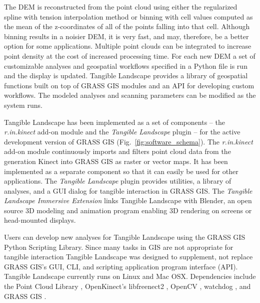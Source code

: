 \documentclass[prodmode,acmtochi]{acmsmall} %
\begin{document}
The DEM is reconstructed from the point cloud
using either the regularized spline with tension 
interpolation method \cite{Mitasova2005}
or binning with cell values computed 
as the mean of the z-coordinates of all of the points 
falling into that cell.
Although binning results in a noisier DEM, it is very fast,
and may, therefore, be a better option for some applications. 
Multiple point clouds can be integrated 
to increase point density at the cost of increased
processing time.
%
For each new DEM 
a set of customizable analyses and geospatial workflows
specified in a Python file is run and the display is updated.
Tangible Landscape provides a library of geospatial functions 
built on top of GRASS GIS modules 
and an API for developing custom workflows.
The modeled analyses and scanning parameters can be modified 
as the system runs.

Tangible Landscape has been implemented as a set of components 
-- the \emph{r.in.kinect} add-on module \cite{r.in.kinect}
and the \emph{Tangible Landscape} plugin \cite{grass-tangible-landscape}
--
for the active development version of GRASS GIS (Fig.~\ref{fig:software_schema}). 
The \emph{r.in.kinect} add-on module continuously imports and filters point cloud data from the  generation Kinect into GRASS GIS as raster or vector maps. 
It has been implemented as a separate component so that it can easily be used for other applications.
The \emph{Tangible Landscape} plugin provides 
utilities, a library of analyses, and a GUI dialog for tangible interaction in GRASS GIS.
The \emph{Tangible Landscape Immersive Extension} \cite{tangible-landscape-immersive-extension}
links Tangible Landscape with Blender, 
an open source 3D modeling and animation program \cite{Blender} 
enabling 3D rendering on screens or head-mounted displays.

Users can develop new analyses for Tangible Landscape 
using the GRASS GIS Python Scripting Library.  %
Since many tasks in GIS are not appropriate for tangible interaction
Tangible Landscape was designed to supplement, 
not replace GRASS GIS's GUI, CLI, and scripting application program interface (API). 
Tangible Landscape currently runs on Linux and Mac OSX.
Dependencies include the Point Cloud Library \cite{Rusu2011,PCL}, 
OpenKinect's libfreenect2 \cite{OpenKinect}, 
OpenCV \cite{OpenCV},  
watchdog \cite{watchdog}, 
and GRASS GIS \cite{GRASS_GIS_software}.
\end{document}
